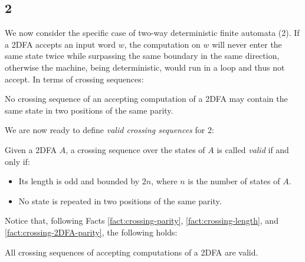 \subsection{2\DFAs{}}
We now consider the specific case of two-way deterministic finite automata (2\DFAs{}).
If a 2DFA accepts an input word $w$, the computation on $w$ will never enter the same state twice while surpassing the same boundary in the same direction, otherwise the machine, being deterministic, would run in a loop and thus not accept.
In terms of crossing sequences:
\begin{fact}\label{fact:crossing-2DFA-parity}
	No crossing sequence of an accepting computation of a 2DFA may contain the same state in two positions of the same parity.
\end{fact}

We are now ready to define \emph{valid crossing sequences} for 2\DFAs{}:
\begin{defn}
	Given a 2DFA $A$, a crossing sequence over the states of $A$ is called \emph{valid} if and only if:
	\begin{itemize}
		\item Its length is odd and bounded by $2n$, where $n$ is the number of states of $A$.
		\item No state is repeated in two positions of the same parity.
	\end{itemize}
\end{defn}

Notice that, following Facts \ref{fact:crossing-parity}, \ref{fact:crossing-length}, and \ref{fact:crossing-2DFA-parity}, the following holds:
\begin{fact}
	All crossing sequences of accepting computations of a 2DFA are valid.
\end{fact}

